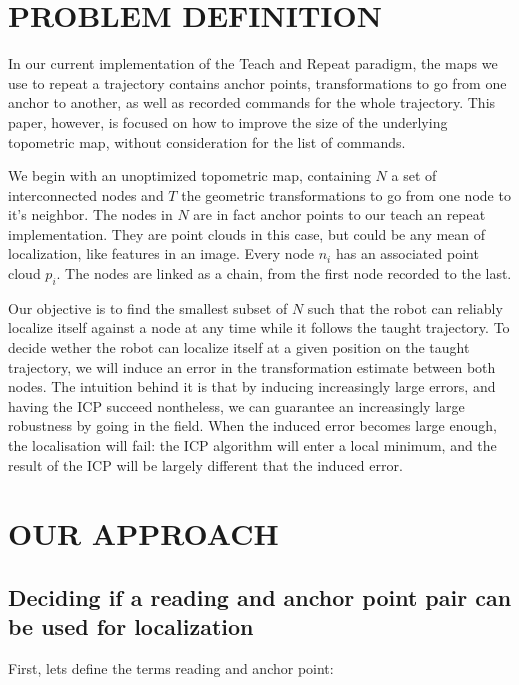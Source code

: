 \documentclass[letterpaper,10 pt,conference]{ieeeconf}
\begin{document}
\section{PROBLEM DEFINITION}

In our current implementation of the Teach and Repeat paradigm, the maps we use to repeat a
trajectory contains anchor points, transformations to go from one anchor to another, as well as
recorded commands for the whole trajectory. This paper, however, is focused on how to improve the
size of the underlying topometric map, without consideration for the list of commands.

We begin with an unoptimized topometric map, containing $N$ a set of interconnected nodes and $T$
the geometric transformations to go from one node to it's neighbor. The nodes in $N$ are in fact
anchor points to our teach an repeat implementation. They are point clouds in this case, but could
be any mean of localization, like features in an image. Every node $n_i$ has an associated point
cloud $p_i$. The nodes are linked as a chain, from the first node recorded to the last.

Our objective is to find the smallest subset of $N$ such that the robot can reliably localize itself
against a node at any time while it follows the taught trajectory. To decide wether the robot can
localize itself at a given position on the taught trajectory, we will induce an error in the
transformation estimate between both nodes. The intuition behind it is that by inducing increasingly
large errors, and having the ICP succeed nontheless, we can guarantee an increasingly large
robustness by going in the field. When the induced error becomes large enough, the localisation will
fail: the ICP algorithm will enter a local minimum, and the result of the ICP will be largely
different that the induced error.

\section{OUR APPROACH}
\label{approach}

\subsection{Deciding if a reading and anchor point pair can be used for localization}
\label{approach-deciding-converge}

First, lets define the terms reading and anchor point:
\end{document}
